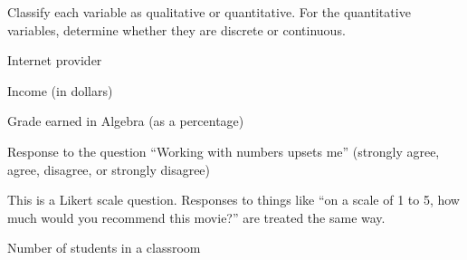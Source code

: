 \documentclass{ximera}
\begin{document}
\begin{problem}
Classify each variable as qualitative or quantitative. For the quantitative variables, determine whether they are discrete or continuous.

\begin{question}
Internet provider
\begin{multipleChoice}
\end{multipleChoice}
\end{question}

\begin{question}
Income (in dollars)
\begin{multipleChoice}
\end{multipleChoice}
\end{question}

\begin{question}
Grade earned in Algebra (as a percentage)
\begin{multipleChoice}
\end{multipleChoice}
\end{question}

\begin{question}
Response to the question ``Working with numbers upsets me'' (strongly agree, agree, disagree, or strongly disagree)
\begin{multipleChoice}
\end{multipleChoice}
\begin{explanation}
This is a Likert scale question. Responses to things like ``on a scale of 1 to 5, how much would you recommend this movie?'' are treated the same way.
\end{explanation}
\end{question}

\begin{question}
Number of students in a classroom
\begin{multipleChoice}
\end{multipleChoice}
\end{question}
\end{problem}
\end{document}
